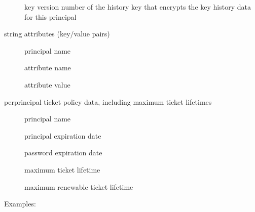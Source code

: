 \documentclass[letterpaper,10pt,english]{sphinxmanual}
\begin{document}
\begin{description}
\begin{description}
\item[{}] \leavevmode
\sphinxAtStartPar
key version number of the history key that encrypts the key
history data for this principal

\end{description}

\item[{\sphinxstylestrong{princ\_stringattrs}}] \leavevmode
\sphinxAtStartPar
string attributes (key/value pairs)
\begin{description}
\item[{}] \leavevmode
\sphinxAtStartPar
principal name

\item[{}] \leavevmode
\sphinxAtStartPar
attribute name

\item[{}] \leavevmode
\sphinxAtStartPar
attribute value

\end{description}

\item[{\sphinxstylestrong{princ\_tktpolicy}}] \leavevmode
\sphinxAtStartPar
per\sphinxhyphen{}principal ticket policy data, including maximum ticket
lifetimes
\begin{description}
\item[{}] \leavevmode
\sphinxAtStartPar
principal name

\item[{}] \leavevmode
\sphinxAtStartPar
principal expiration date

\item[{}] \leavevmode
\sphinxAtStartPar
password expiration date

\item[{}] \leavevmode
\sphinxAtStartPar
maximum ticket lifetime

\item[{}] \leavevmode
\sphinxAtStartPar
maximum renewable ticket lifetime

\end{description}

\end{description}

\sphinxAtStartPar
Examples:
\end{document}
